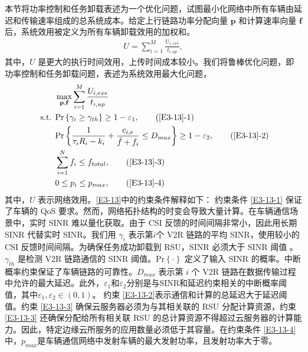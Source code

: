 本节将功率控制和任务卸载表述为一个优化问题，试图最小化网络中所有车辆由延迟和传输速率组成的总系统成本。给定上行链路功率分配向量 $\mathbf{p}$ 和计算速率向量 $\mathbf{f}$ 后，系统效用被定义为所有车辆卸载效用的加权和。
\begin{eqnarray}\label{E12}
U=\sum_{i=1}^{M}\frac{U_{i,exe}}{t_{i,up}},
\end{eqnarray}
其中，$U$ 是更大的执行时间效用，上传时间成本较小。我们将鲁棒优化问题，即功率控制和任务卸载问题，表述为系统效用最大化问题，
\begin{align}
& \max\limits_{\mathbf{p},\mathbf{f}}\sum_{i=1}^{M}\frac{U_{i,exe}}{t_{i,up}}                                   \label{E3-13}\\
\text { s.t. }
& \textrm{Pr}\left\{\gamma_i\geq\gamma_{th}\right\}\geq1-\varepsilon_1,                                         \tag{\ref{E3-13}{-1}}      \label{E3-13-1}\\  %
& \textrm{Pr}\left\{\frac{1}{\tau_iR_i-k_i}+\frac{c_{i,e}}{\bar{f}+f_i}\le D_{max}\right\}\geq1-\varepsilon_2,  \tag{\ref{E3-13}{-2}}      \label{E3-13-2}\\  %
& \sum_{i=1}^{N}f_i\le f_{total},                                                                               \tag{\ref{E3-13}{-3}}      \label{E3-13-3}\\  %
& 0\le p_i\le p_{max},                                                                                          \tag{\ref{E3-13}{-4}}      \label{E3-13-4} %
\end{align}
其中，$U$ 表示网络效用。\eqref{E3-13}中的约束条件解释如下： 约束条件 \eqref{E3-13-1} 保证了车辆的 QoS 要求。然而，网络拓扑结构的时变会导致大量计算。在车辆通信场景中，实时 SINR 难以量化获取。由于 CSI 反馈的时间间隔非常小，因此用长期 SINR 代替实时 SINR。我们用 $\gamma_i$ 表示第$i$个 V2R {链路的平均 SINR，使用较小的 CSI 反馈时间间隔}。为确保任务成功卸载到 RSU，SINR 必须大于 SINR 阈值 \cite{liu2021}。$\gamma_{th}$ 是检测 V2R 链路通信的 SINR 阈值。$\textrm{Pr}\left\{\cdot\right\}$ 定义了输入 SINR 的概率。中断概率约束保证了车辆链路的可靠性。$D_{max}$ 表示第 $i$ 个 V2R 链路在数据传输过程中允许的最大延迟。此外，$\varepsilon_1$和$\varepsilon_2$分别是与SINR和延迟约束相关的中断概率阈值，其中$\varepsilon_1,\varepsilon_2\in\left(0,1\right)$。 约束 \eqref{E3-13-2}表示通信和计算的总延迟大于延迟阈值。约束 \eqref{E3-13-3} 确保云服务器必须为与其相关联的 RSU 分配计算资源，约束 \eqref{E3-13-3} 还确保分配给所有相关联 RSU 的总计算资源不得超过云服务器的计算能力。因此，特定边缘云所服务的应用数量必须低于其容量。在约束条件 \eqref{E3-13-4}中，$p_{max}$是车辆通信网络中发射车辆的最大发射功率，且发射功率大于零。


